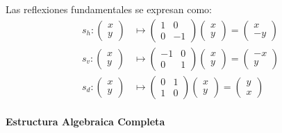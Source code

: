 \begin{definition}
Las reflexiones fundamentales se expresan como:
\begin{align}
s_h: \begin{pmatrix} x \\ y \end{pmatrix} &\mapsto \begin{pmatrix} 1 & 0 \\ 0 & -1 \end{pmatrix} \begin{pmatrix} x \\ y \end{pmatrix} = \begin{pmatrix} x \\ -y \end{pmatrix} \\
s_v: \begin{pmatrix} x \\ y \end{pmatrix} &\mapsto \begin{pmatrix} -1 & 0 \\ 0 & 1 \end{pmatrix} \begin{pmatrix} x \\ y \end{pmatrix} = \begin{pmatrix} -x \\ y \end{pmatrix} \\
s_d: \begin{pmatrix} x \\ y \end{pmatrix} &\mapsto \begin{pmatrix} 0 & 1 \\ 1 & 0 \end{pmatrix} \begin{pmatrix} x \\ y \end{pmatrix} = \begin{pmatrix} y \\ x \end{pmatrix}
\end{align}
\end{definition}

\paragraph{Estructura Algebraica Completa}

